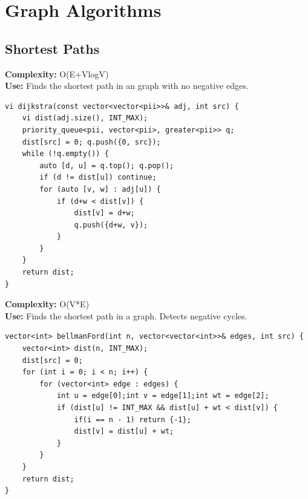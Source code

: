 \documentclass[10pt,a4paper]{article}
\begin{document}
\section{Graph Algorithms}

\subsection{Shortest Paths}

\textbf{Complexity:} O(E+VlogV)\\
\textbf{Use:} Finds the shortest path in an graph with no negative edges.\\
\begin{verbatim}
vi dijkstra(const vector<vector<pii>>& adj, int src) {
    vi dist(adj.size(), INT_MAX);
    priority_queue<pii, vector<pii>, greater<pii>> q;
    dist[src] = 0; q.push({0, src});
    while (!q.empty()) {
        auto [d, u] = q.top(); q.pop();
        if (d != dist[u]) continue;
        for (auto [v, w] : adj[u]) {
            if (d+w < dist[v]) {
                dist[v] = d+w;
                q.push({d+w, v});
            }
        }
    }
    return dist;
}
\end{verbatim}
\textbf{Complexity:} O(V*E)\\
\textbf{Use:} Finds the shortest path in a graph. Detects negative cycles.\\
\begin{verbatim}
vector<int> bellmanFord(int n, vector<vector<int>>& edges, int src) {
	vector<int> dist(n, INT_MAX);
	dist[src] = 0;
	for (int i = 0; i < n; i++) {
		for (vector<int> edge : edges) {
			int u = edge[0];int v = edge[1];int wt = edge[2];
			if (dist[u] != INT_MAX && dist[u] + wt < dist[v]) {
                if(i == n - 1) return {-1};
                dist[v] = dist[u] + wt;
            }
		}
	}
    return dist;
}
\end{verbatim}
\end{document}
